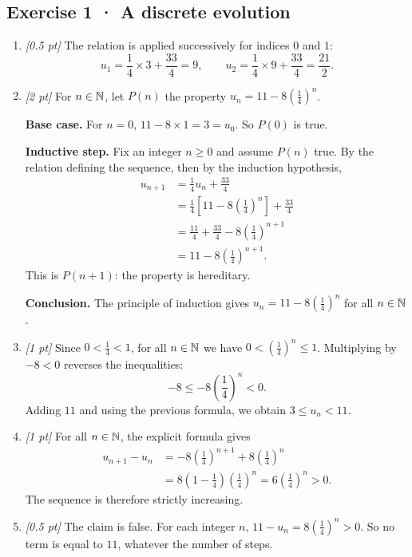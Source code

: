 \subsection*{Exercise 1 · A discrete evolution}\begin{enumerate}

\item \textit{[0.5 pt]} The relation is applied successively for indices $0$ and $1$:\[u_1=\frac{1}{4}\times 3+\frac{33}{4}=9,\qquad u_2=\frac{1}{4}\times 9+\frac{33}{4}=\frac{21}{2}.\]

\item \textit{[2 pt]} For $n\in\mathbb N$, let $P(n)$ the property $u_n=11-8\left(\frac{1}{4}\right)^n$.
\par\smallskip\textbf{Base case.} For $n=0$, $11-8\times1=3=u_0$. So $P(0)$ is true.
\par\smallskip\textbf{Inductive step.} Fix an integer $n\ge0$ and assume $P(n)$ true. By the relation defining the sequence, then by the induction hypothesis,
\[\begin{aligned}u_{n+1}&=\frac{1}{4}u_n+\frac{33}{4}\\
&=\frac{1}{4}\left[11-8\left(\frac{1}{4}\right)^n\right]+\frac{33}{4}\\
&=\frac{11}{4}+\frac{33}{4}-8\left(\frac{1}{4}\right)^{n+1}\\
&=11-8\left(\frac{1}{4}\right)^{n+1}.
\end{aligned}\]
This is $P(n+1)$: the property is hereditary.
\par\smallskip\textbf{Conclusion.} The principle of induction gives $u_n=11-8\left(\frac{1}{4}\right)^n$ for all $n\in\mathbb N$.

\item \textit{[1 pt]} Since $0<\frac{1}{4}<1$, for all $n\in\mathbb N$ we have $0<(\frac{1}{4})^n\le1$. Multiplying by $-8<0$ reverses the inequalities:
\[-8\le-8(\frac{1}{4})^n<0.\]
Adding $11$ and using the previous formula, we obtain $3\le u_n<11$.

\item \textit{[1 pt]} For all $n\in\mathbb N$, the explicit formula gives
\[\begin{aligned}u_{n+1}-u_n&=-8(\frac{1}{4})^{n+1}+8(\frac{1}{4})^n\\&=8(1-\frac{1}{4})(\frac{1}{4})^n=6(\frac{1}{4})^n>0.\end{aligned}\]
The sequence is therefore strictly increasing.

\item \textit{[0.5 pt]} The claim is false. For each integer $n$, $11-u_n=8(\frac{1}{4})^n>0$. So no term is equal to $11$, whatever the number of steps.

\end{enumerate}

